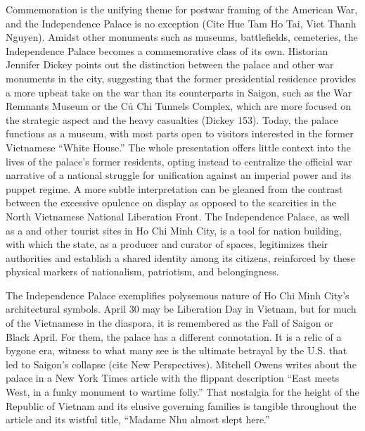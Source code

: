\vi Commemoration is the unifying theme for postwar framing of the American War, and the Independence Palace is no exception (Cite Hue Tam Ho Tai, Viet Thanh Nguyen). Amidst other monuments such as museums, battlefields, cemeteries, the Independence Palace becomes a commemorative class of its own. Historian Jennifer Dickey points out the distinction between the palace and other war monuments in the city, suggesting that the former presidential residence provides a more upbeat take on the war than its counterparts in Saigon, such as the War Remnants Museum or the Củ Chi Tunnels Complex, which are more focused on the strategic aspect and the heavy casualties (Dickey 153). Today, the palace functions as a museum, with most parts open to visitors interested in the former Vietnamese “White House.” The whole presentation offers little context into the lives of the palace’s former residents, opting instead to centralize the official war narrative of a national struggle for unification against an imperial power and its puppet regime. A more subtle interpretation can be gleaned from the contrast between the excessive opulence on display as opposed to the scarcities in the North Vietnamese National Liberation Front. The Independence Palace, as well as a and other tourist sites in Ho Chi Minh City, is a tool for nation building, with which the state, as a producer and curator of spaces, legitimizes their authorities and establish a shared identity among its citizens, reinforced by these physical markers of nationalism, patriotism, and belongingness.

The Independence Palace exemplifies polysemous nature of Ho Chi Minh City’s architectural symbols. April 30 may be Liberation Day in Vietnam, but for much of the Vietnamese in the diaspora, it is remembered as the Fall of Saigon or Black April.  For them, the palace has a different connotation. It is a relic of a bygone era, witness to what many see is the ultimate betrayal by the U.S. that led to Saigon’s collapse (cite New Perspectives). Mitchell Owens writes about the palace in a New York Times article with the flippant description “East meets West, in a funky monument to wartime folly.” That nostalgia for the height of the Republic of Vietnam and its elusive governing families is tangible throughout the article and its wistful title, “Madame Nhu almost slept here.” 

